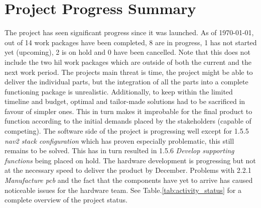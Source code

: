 \section{Project Progress Summary}






The project has seen significant progress since it was launched. As of \today, out of 14 work packages have been completed, 8 are in progress, 1 has not started yet (upcoming), 2 is on hold and 0 have been cancelled. Note that this does not include the two \ac{hil} work packages which are outside of both the current and the next work period.
The projects main threat is time, the project might be able to deliver the individual parts, but the integration of all the parts into a complete functioning package is unrealistic. Additionally, to keep within the limited timeline and budget, optimal and tailor-made solutions had to be sacrificed in favour of simpler ones. This in turn makes it improbable for the final product to function according to the initial demands placed by the stakeholders (capable of competing).
The software side of the project is progressing well except for 1.5.5 \textit{nav2 stack configuration} which has proven especially problematic, this still remains to be solved. This has in turn resulted in 1.5.6 \textit{Develop supporting functions} being placed on hold.
The hardware development is progressing but not at the necessary speed to deliver the product by December. Problems with 2.2.1 \textit{Manufacture \acs{pcb}} and the fact that the components have yet to arrive has caused noticeable issues for the hardware team.
See Table.\:\ref{tab:activity_status} for a complete overview of the project status.


\begin{comment}
Work packages that have been completed are: 
Work packages that are in progress are: 
Work packages that are not started yet are: 

The main issues we had so far are................These issues have caused \textbf{(Delay, blocking or risk of ON track work packages)}
The issues are (solved, still have them) and we plan to solve them by...... 
\end{comment}

